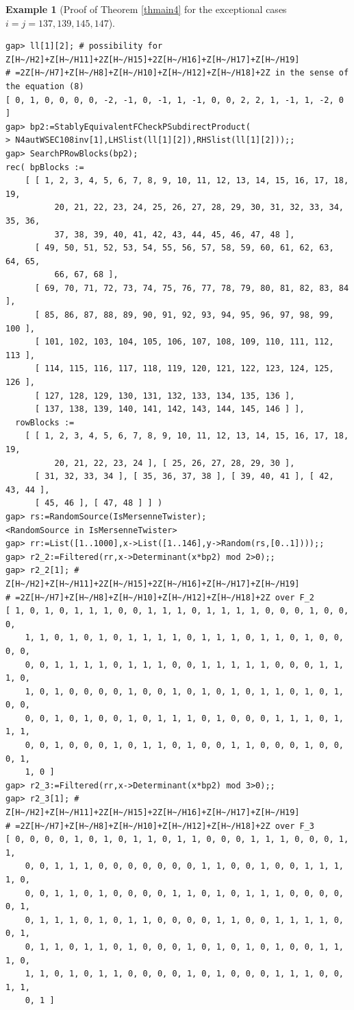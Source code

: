 \documentclass{amsart}
\theoremstyle{plain}
\theoremstyle{definition}
\newtheorem{example}[theorem]{Example}
\theoremstyle{remark}
\begin{document}
\begin{example}[Proof of {Theorem \ref{thmain4}} for the exceptional cases $i=j=137,139,145,147$]
\begin{verbatim}
gap> ll[1][2]; # possibility for Z[H~/H2]+Z[H~/H11]+2Z[H~/H15]+2Z[H~/H16]+Z[H~/H17]+Z[H~/H19]
# =2Z[H~/H7]+Z[H~/H8]+Z[H~/H10]+Z[H~/H12]+Z[H~/H18]+2Z in the sense of the equation (8)
[ 0, 1, 0, 0, 0, 0, -2, -1, 0, -1, 1, -1, 0, 0, 2, 2, 1, -1, 1, -2, 0 ]
gap> bp2:=StablyEquivalentFCheckPSubdirectProduct(
> N4autWSEC108inv[1],LHSlist(ll[1][2]),RHSlist(ll[1][2]));;
gap> SearchPRowBlocks(bp2);
rec( bpBlocks := 
    [ [ 1, 2, 3, 4, 5, 6, 7, 8, 9, 10, 11, 12, 13, 14, 15, 16, 17, 18, 19, 
          20, 21, 22, 23, 24, 25, 26, 27, 28, 29, 30, 31, 32, 33, 34, 35, 36, 
          37, 38, 39, 40, 41, 42, 43, 44, 45, 46, 47, 48 ], 
      [ 49, 50, 51, 52, 53, 54, 55, 56, 57, 58, 59, 60, 61, 62, 63, 64, 65, 
          66, 67, 68 ], 
      [ 69, 70, 71, 72, 73, 74, 75, 76, 77, 78, 79, 80, 81, 82, 83, 84 ], 
      [ 85, 86, 87, 88, 89, 90, 91, 92, 93, 94, 95, 96, 97, 98, 99, 100 ], 
      [ 101, 102, 103, 104, 105, 106, 107, 108, 109, 110, 111, 112, 113 ], 
      [ 114, 115, 116, 117, 118, 119, 120, 121, 122, 123, 124, 125, 126 ], 
      [ 127, 128, 129, 130, 131, 132, 133, 134, 135, 136 ], 
      [ 137, 138, 139, 140, 141, 142, 143, 144, 145, 146 ] ], 
  rowBlocks := 
    [ [ 1, 2, 3, 4, 5, 6, 7, 8, 9, 10, 11, 12, 13, 14, 15, 16, 17, 18, 19, 
          20, 21, 22, 23, 24 ], [ 25, 26, 27, 28, 29, 30 ], 
      [ 31, 32, 33, 34 ], [ 35, 36, 37, 38 ], [ 39, 40, 41 ], [ 42, 43, 44 ], 
      [ 45, 46 ], [ 47, 48 ] ] )
gap> rs:=RandomSource(IsMersenneTwister);
<RandomSource in IsMersenneTwister>
gap> rr:=List([1..1000],x->List([1..146],y->Random(rs,[0..1])));;
gap> r2_2:=Filtered(rr,x->Determinant(x*bp2) mod 2>0);;
gap> r2_2[1]; # Z[H~/H2]+Z[H~/H11]+2Z[H~/H15]+2Z[H~/H16]+Z[H~/H17]+Z[H~/H19]
# =2Z[H~/H7]+Z[H~/H8]+Z[H~/H10]+Z[H~/H12]+Z[H~/H18]+2Z over F_2
[ 1, 0, 1, 0, 1, 1, 1, 0, 0, 1, 1, 1, 0, 1, 1, 1, 1, 0, 0, 0, 1, 0, 0, 0, 
    1, 1, 0, 1, 0, 1, 0, 1, 1, 1, 1, 0, 1, 1, 1, 0, 1, 1, 0, 1, 0, 0, 0, 0, 
    0, 0, 1, 1, 1, 1, 0, 1, 1, 1, 0, 0, 1, 1, 1, 1, 1, 0, 0, 0, 1, 1, 1, 0, 
    1, 0, 1, 0, 0, 0, 0, 1, 0, 0, 1, 0, 1, 0, 1, 0, 1, 1, 0, 1, 0, 1, 0, 0, 
    0, 0, 1, 0, 1, 0, 0, 1, 0, 1, 1, 1, 0, 1, 0, 0, 0, 1, 1, 1, 0, 1, 1, 1, 
    0, 0, 1, 0, 0, 0, 1, 0, 1, 1, 0, 1, 0, 0, 1, 1, 0, 0, 0, 1, 0, 0, 0, 1, 
    1, 0 ]
gap> r2_3:=Filtered(rr,x->Determinant(x*bp2) mod 3>0);;
gap> r2_3[1]; # Z[H~/H2]+Z[H~/H11]+2Z[H~/H15]+2Z[H~/H16]+Z[H~/H17]+Z[H~/H19]
# =2Z[H~/H7]+Z[H~/H8]+Z[H~/H10]+Z[H~/H12]+Z[H~/H18]+2Z over F_3
[ 0, 0, 0, 0, 1, 0, 1, 0, 1, 1, 0, 1, 1, 0, 0, 0, 1, 1, 1, 0, 0, 0, 1, 1, 
    0, 0, 1, 1, 1, 0, 0, 0, 0, 0, 0, 0, 1, 1, 0, 0, 1, 0, 0, 1, 1, 1, 1, 0, 
    0, 0, 1, 1, 0, 1, 0, 0, 0, 0, 1, 1, 0, 1, 0, 1, 1, 1, 0, 0, 0, 0, 0, 1, 
    0, 1, 1, 1, 0, 1, 0, 1, 1, 0, 0, 0, 0, 1, 1, 0, 0, 1, 1, 1, 1, 0, 0, 1, 
    0, 1, 1, 0, 1, 1, 0, 1, 0, 0, 0, 1, 0, 1, 0, 1, 0, 1, 0, 0, 1, 1, 1, 0, 
    1, 1, 0, 1, 0, 1, 1, 0, 0, 0, 0, 1, 0, 1, 0, 0, 0, 1, 1, 1, 0, 0, 1, 1, 
    0, 1 ]


\end{verbatim}
\end{example}
\end{document}
